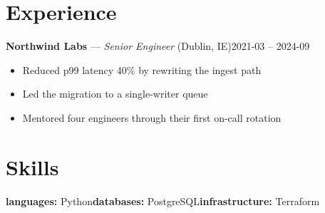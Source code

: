 \documentclass[10pt]{article}
\begin{document}
\par
\vspace{2pt}
\par
\vspace{2pt}
\section*{Experience}
\noindent\textbf{Northwind Labs} --- \textit{Senior Engineer} (Dublin, IE)\hfill 2021-03 -- 2024-09\\
\begin{itemize}
  \item Reduced p99 latency 40\% by rewriting the ingest path
  \item Led the migration to a single-writer queue
  \item Mentored four engineers through their first on-call rotation
\end{itemize}
\section*{Skills}
\noindent
\textbf{languages:} Python\quad\textbf{databases:} PostgreSQL\quad\textbf{infrastructure:} Terraform\par
\end{document}
